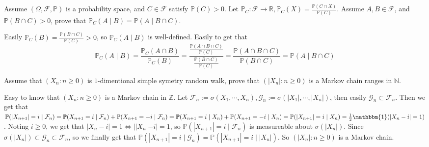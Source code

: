 \documentclass{ctexart}
\newif\ifpreface
\begin{document}
\large
\iffalse
  \setlength{\baselineskip}{1.2em}
  \ifpreface
    
  \else
    \maketitle
  \fi
\fi
{}
\begin{problem}\label{pro:1}
  Assume \((\Omega,\mathcal{F},\mathbb{P})\) is a probability space, and \(C \in \mathcal{F}\) satisfy \(\mathbb{P}(C)>0\).
  Let \(\mathbb{P}_C:\mathcal{F} \to \mathbb{R},\mathbb{P}_C(X)=\frac{\mathbb{P}(C \cap X)}{\mathbb{P}(C)}\).
  Assume \(A,B \in \mathcal{F}\), and \(\mathbb{P}(B \cap C)>0\), prove that
  \(\mathbb{P}_C(A \mid B) = \mathbb{P}(A \mid B \cap C)\).
\end{problem}
\begin{solution}
  Easily \(\mathbb{P}_C(B)=\frac{\mathbb{P}(B \cap C)}{\mathbb{P}(C)}>0\), so \(\mathbb{P}_C(A \mid B)\) is well-defined.
  Easily to get that
  \[
    \mathbb{P}_C(A \mid B)=\frac{\mathbb{P}_C(A \cap B)}{\mathbb{P}_C(B)}=\frac{\frac{\mathbb{P}(A \cap B \cap C)}{\mathbb{P}(C)}}{\frac{\mathbb{P}(B \cap C)}{\mathbb{P}(C)}}=\frac{\mathbb{P}(A \cap B \cap C)}{\mathbb{P}(B \cap C)}=\mathbb{P}(A \mid B \cap C)
  \]
\end{solution}
\begin{problem}\label{pro:2}
  Assume that \((X_n:n \geq 0)\) is \(1\)-dimentional simple symetry random walk, prove that \((|X_n|:n \geq 0)\) is a Markov chain ranges in \(\mathbb{N}\).
\end{problem}
\begin{solution}
  Easy to know that \((X_n:n \geq 0)\) is a Markov chain in \(\mathbb{Z}\).
  Let \(\mathcal{F}_n:=\sigma(X_1,\cdots,X_n),\mathcal{G}_n:=\sigma(|X_1|,\cdots,|X_n|)\), then easily \(\mathcal{G}_n \subset \mathcal{F}_n\).
  Then we get that \(\mathbb{P}(|X_{n+1}|=i \mid \mathcal{F}_n)=\mathbb{P}(X_{n+1}=i \mid \mathcal{F}_n)+\mathbb{P}(X_{n+1}=-i \mid \mathcal{F}_n)=\mathbb{P}(X_{n+1}=i \mid X_n)+\mathbb{P}(X_{n+1}=-i \mid X_n)=\mathbb{P}(|X_{n+1}|=i \mid X_n)=\frac{1}{2}\mathbbm{1}(|X_n-i|=1)\).
  Noting \(i \geq 0\), we get that \(|X_n-i|=1 \iff ||X_n|-i|=1\), so \(\mathbb{P}(|X_{n+1}|=i \mid \mathcal{F}_n)\) is measureable about \(\sigma(|X_n|)\).
  Since \(\sigma(|X_n|)\subset \mathcal{G}_n \subset \mathcal{F}_n\), so we finally get that
  \(\mathbb{P}(|X_{n+1}|=i \mid \mathcal{G}_n)=\mathbb{P}(|X_{n+1}|=i \mid |X_n|)\).
  So \((|X_n|:n \geq 0)\) is a Markov chain.
\end{solution}
\end{document}
